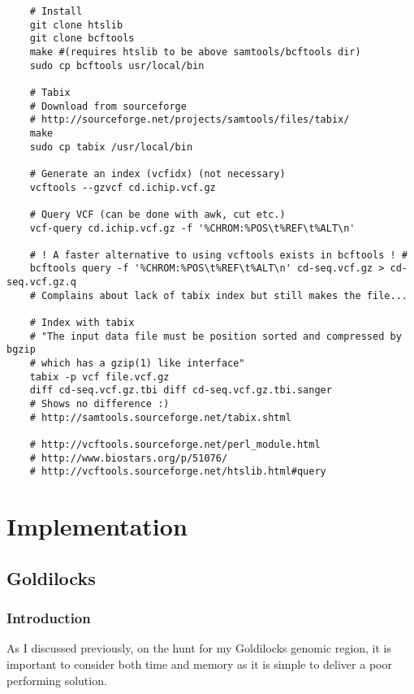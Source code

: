\begin{verbatim}
    # Install
    git clone htslib
    git clone bcftools
    make #(requires htslib to be above samtools/bcftools dir)
    sudo cp bcftools usr/local/bin

    # Tabix
    # Download from sourceforge
    # http://sourceforge.net/projects/samtools/files/tabix/
    make
    sudo cp tabix /usr/local/bin

    # Generate an index (vcfidx) (not necessary)
    vcftools --gzvcf cd.ichip.vcf.gz

    # Query VCF (can be done with awk, cut etc.)
    vcf-query cd.ichip.vcf.gz -f '%CHROM:%POS\t%REF\t%ALT\n'

    # ! A faster alternative to using vcftools exists in bcftools ! #
    bcftools query -f '%CHROM:%POS\t%REF\t%ALT\n' cd-seq.vcf.gz > cd-seq.vcf.gz.q
    # Complains about lack of tabix index but still makes the file...

    # Index with tabix
    # "The input data file must be position sorted and compressed by bgzip 
    # which has a gzip(1) like interface"
    tabix -p vcf file.vcf.gz
    diff cd-seq.vcf.gz.tbi diff cd-seq.vcf.gz.tbi.sanger
    # Shows no difference :)
    # http://samtools.sourceforge.net/tabix.shtml

    # http://vcftools.sourceforge.net/perl_module.html
    # http://www.biostars.org/p/51076/
    # http://vcftools.sourceforge.net/htslib.html#query
\end{verbatim}


\chapter{Implementation}
\section{Goldilocks}
\subsection{Introduction}

As I discussed previously, on the hunt for my Goldilocks genomic region, it is
important to consider both time and memory as it is simple to deliver a poor
performing solution.

